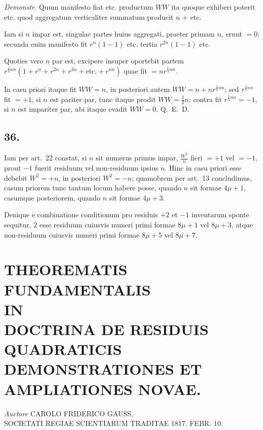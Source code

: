 \documentclass[12pt,a4paper]{article}
\theoremstyle{plain}
\theoremstyle{definition}
\theoremstyle{remark}
\begin{document}
\textit{Demonstr.} Quum manifesto fiat etc. productum $WW$ ita quoque exhiberi poterit etc. quod aggregatum verticaliter summatum producit $n$ + etc.

Iam si $n$ impar est, singulae partes huius aggregati, praeter primam $n$, erunt $=0$; secunda enim manifesto fit $r^n(1-1)$ etc. tertia $r^{2n}(1-1)$ etc.

Quoties vero $n$ par est, excipere insuper oportebit partem $r^{\frac{1}{4}nn}(1+r^n+r^{2n}+r^{3n}+\text{etc.}+r^{nn})$ quae fit $=nr^{\frac{1}{4}nn}$.

In casu priori itaque fit $WW=n$, in posteriori autem $WW = n + nr^{\frac{1}{4}nn}$; sed $r^{\frac{1}{4}nn}$ fit $=+1$, si $n$ est pariter par, tunc itaque prodit $WW=\frac{1}{2}n$; contra fit $r^{\frac{1}{4}nn}=-1$, si $n$ est impariter par, ubi itaque evadit $WW=0$. \hfill Q.~E.~D.

\subsection*{36.}
Iam per art.~22 constat, si $n$ sit numerus primus impar, $\frac{W^2}{n}$ fieri $=+1$ vel $=-1$, prout $-1$ fuerit residuum vel non-residuum ipsius $n$. Hinc in casu priori esse debebit $W^2=+n$, in posteriori $W^2=-n$; quamobrem per art.~13 concludimus, casum priorem tunc tantum locum habere posse, quando $n$ sit formae $4\mu+1$, casumque posteriorem, quando $n$ sit formae $4\mu+3$.

Denique e combinatione conditionum pro residuis $+2$ et $-1$ inventarum sponte sequitur, $2$ esse residuum cuiusvis numeri primi formae $8\mu+1$ vel $8\mu+3$, atque non-residuum cuiusvis numeri primi formae $8\mu+5$ vel $8\mu+7$.


\newpage
\section*{THEOREMATIS FUNDAMENTALIS\\IN\\DOCTRINA DE RESIDUIS QUADRATICIS\\DEMONSTRATIONES ET AMPLIATIONES NOVAE.}

\begin{center}
\textit{Auctore} CAROLO FRIDERICO GAUSS,\\
SOCIETATI REGIAE SCIENTIARUM TRADITAE 1817. FEBR. 10.
\end{center}
\end{document}
